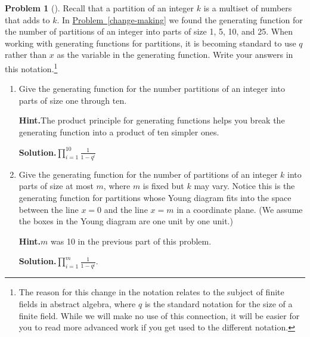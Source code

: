 \documentclass[10pt,]{book}
\theoremstyle{plain}
\theoremstyle{definition}
\newtheorem{activity}[project]{Problem}
\theoremstyle{definition}
\numberwithin{equation}{chapter}
\begin{document}
\begin{activity}[]\label{activity-201}
Recall that a partition of an integer \(k\) is a multiset of numbers that adds to \(k\). In \hyperref[change-making]{Problem~\ref{change-making}} we found the generating function for the number of partitions of an integer into parts of size 1, 5, 10, and 25. When working with generating functions for partitions, it is becoming standard to use \(q\) rather than \(x\) as the variable in the generating function.  Write your answers in this notation.\footnote{The reason for this change in the notation relates to the subject of finite fields in abstract algebra, where \(q\) is the standard notation for the size of a finite field.  While we will make no use of this connection, it will be easier for you to read more advanced work if you get used to the different notation.\label{fn-13}}%
\begin{enumerate}[font=\bfseries,label=(\alph*),ref=\alph*]
\item\label{task-135} Give the generating function for the number partitions of an integer into parts of size one through ten.%
\par\medskip\noindent%
\textbf{Hint.}\quad The product principle for generating functions helps you break the generating function into a product of ten simpler ones.%
\par\medskip\noindent%
\textbf{Solution.}\quad \(\prod_{i=1}^{10}\frac{1}{1-q^i}\)%
\item\label{largestpartatmostm} Give the generating function for the number of partitions of an integer \(k\) into parts of size at most \(m\), where \(m\) is fixed but \(k\) may vary. Notice this is the generating function for partitions whose Young diagram fits into the space between the line \(x=0\) and the line \(x=m\) in a coordinate plane. (We assume the boxes in the Young diagram are one unit by one unit.)%
\par\medskip\noindent%
\textbf{Hint.}\quad \(m\) was 10 in the previous part of this problem.%
\par\medskip\noindent%
\textbf{Solution.}\quad \(\prod_{i=1}^m\frac{1}{1-q^i}\).%
\end{enumerate}
\end{activity}
\end{document}
